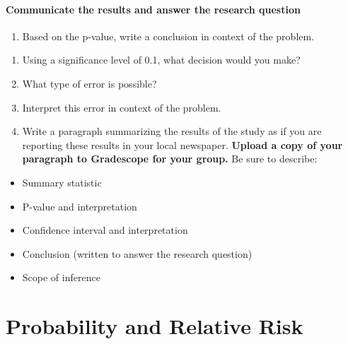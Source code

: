 \documentclass[
]{report}
\providecommand{\tightlist}{%
  \setlength{\itemsep}{0pt}\setlength{\parskip}{0pt}}
\begin{document}
\hypertarget{communicate-the-results-and-answer-the-research-question-6}{%
\subsubsection*{Communicate the results and answer the research question}\label{communicate-the-results-and-answer-the-research-question-6}}

\begin{enumerate}
\def\labelenumi{\arabic{enumi}.}
\setcounter{enumi}{11}
\tightlist
\item
  Based on the p-value, write a conclusion in context of the problem.
\end{enumerate}

\vspace{.8in}

\begin{enumerate}
\def\labelenumi{\arabic{enumi}.}
\setcounter{enumi}{12}
\item
  Using a significance level of 0.1, what decision would you make?
  \vspace{0.2in}
\item
  What type of error is possible?
  \vspace{0.3in}
\item
  Interpret this error in context of the problem.
  \vspace{0.8in}
\item
  Write a paragraph summarizing the results of the study as if you are reporting these results in your local newspaper. \textbf{Upload a copy of your paragraph to Gradescope for your group.} Be sure to describe:
\end{enumerate}

\begin{itemize}
\item
  Summary statistic
\item
  P-value and interpretation
\item
  Confidence interval and interpretation
\item
  Conclusion (written to answer the research question)
\item
  Scope of inference
\end{itemize}

\vspace{3in}

\newpage

\hypertarget{probability-and-relative-risk}{%
\chapter{Probability and Relative Risk}\label{probability-and-relative-risk}}
\end{document}

